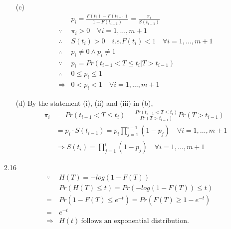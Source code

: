 \documentclass[paper=a4, fontsize=12pt]{scrartcl} %
\numberwithin{equation}{section} %
\numberwithin{figure}{section} %
\numberwithin{table}{section} %
\begin{document}
\begin{itemize}
	\item[(c)]{
		\begin{align*}
					& 	p_i = \frac{F(t_i)-F(t_{i-1})}{1-F(t_{i-1})} = \frac{\pi_i}{S(t_{i-1})}\\
			\because 	&	\pi_i>0 \quad \forall i = 1, \dots, m+1\\
			\therefore 	&	S(t_{i})>0 \quad i.e. F(t_i)<1 \quad \forall i = 1, \dots, m+1\\
		 	\therefore 	&	p_i \neq 0 \land p_i \neq 1\\
			\because 	&	p_i = Pr(t_{i-1}<T\leq t_{i} \vert T>t_{i-1}) \\
			\therefore 	&	0\leq p_i \leq1\\
			\Rightarrow&	0<p_i<1 \quad \forall i = 1, \dots, m+1
		\end{align*}
	}
	
	\item[(d)]{
		By the statement (i), (ii) and (iii) in (b),
		\begin{align*}
			\pi_i 		&= 	Pr(t_{i-1} < T \leq t_i) = \frac{Pr(t_{i-1} < T \leq t_i)}{Pr(T>t_{i-1})}Pr(T>t_{i-1})\\
					&=	p_i \cdot S(t_{i-1}) =	p_i \prod_{j=1}^{i-1}(1-p_j)\quad \forall i = 1, \dots, m+1\\
					&\Rightarrow S(t_i) = \prod_{j=1}^{i}(1-p_j) \quad \forall i = 1, \dots, m+1
		\end{align*}
	}
\end{itemize}


2.16
\begin{align*}
	\because	&	H(T) =-log(1-F(T))\\
			&	Pr(H(T) \leq t) = Pr(-log(1-F(T)) \leq t) \\
	=		&	Pr(1-F(T) \leq e^{-t}) = Pr(F(T) \geq 1- e^{-t} )\\
	=		&	e^{-t}\\
	\Rightarrow&	H(t) \ \text{follows an exponential distribution.}
	\end{align*}

\end{document}
